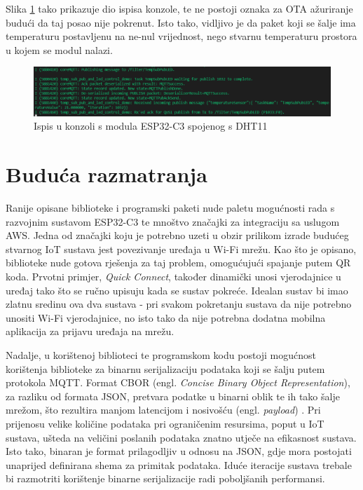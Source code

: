 Slika \ref{fig:komadic_outputa} tako prikazuje dio ispisa konzole, te ne postoji oznaka za OTA ažuriranje budući da taj posao nije pokrenut. Isto tako, vidljivo je da paket koji se šalje ima temperaturu postavljenu na ne-nul vrijednost, nego stvarnu temperaturu prostora u kojem se modul nalazi. 

\begin{figure}[ht]
	\centering
	\includegraphics[scale=0.5]{imgs/komadic_outputa}
	\caption{Ispis u konzoli s modula ESP32-C3 spojenog s DHT11}
	\label{fig:komadic_outputa}
\end{figure}


\section{Buduća razmatranja}

Ranije opisane biblioteke i programski paketi nude paletu mogućnosti rada s razvojnim sustavom ESP32-C3 te mnoštvo značajki za integraciju sa uslugom AWS. Jedna od značajki koju je potrebno uzeti u obzir prilikom izrade budućeg stvarnog IoT sustava jest povezivanje uređaja u Wi-Fi mrežu. Kao što je opisano, biblioteke nude gotova rješenja za taj problem, omogućujući spajanje putem QR koda. Prvotni primjer, \textit{Quick Connect}, također dinamički unosi vjerodajnice u uređaj tako što se ručno upisuju kada se sustav pokreće. Idealan sustav bi imao zlatnu sredinu ova dva sustava - pri svakom pokretanju sustava da nije potrebno unositi Wi-Fi vjerodajnice, no isto tako da nije potrebna dodatna mobilna aplikacija za prijavu uređaja na mrežu. 

Nadalje, u korištenoj biblioteci te programskom kodu postoji mogućnost korištenja biblioteke za binarnu serijalizaciju podataka koji se šalju putem protokola MQTT. Format CBOR (engl. \textit{Concise Binary Object Representation}), za razliku od formata JSON, pretvara podatke u binarni oblik te ih tako šalje mrežom, što rezultira manjom latencijom i nosivošću (engl. \textit{payload}) \cite{cbor}. Pri prijenosu velike količine podataka pri ograničenim resursima, poput u IoT sustava, ušteda na veličini poslanih podataka znatno utječe na efikasnost sustava. Isto tako, binaran je format prilagodljiv u odnosu na JSON, gdje mora postojati unaprijed definirana shema za primitak podataka. Iduće iteracije sustava trebale bi razmotriti korištenje binarne serijalizacije radi poboljšanih performansi. 

\eject